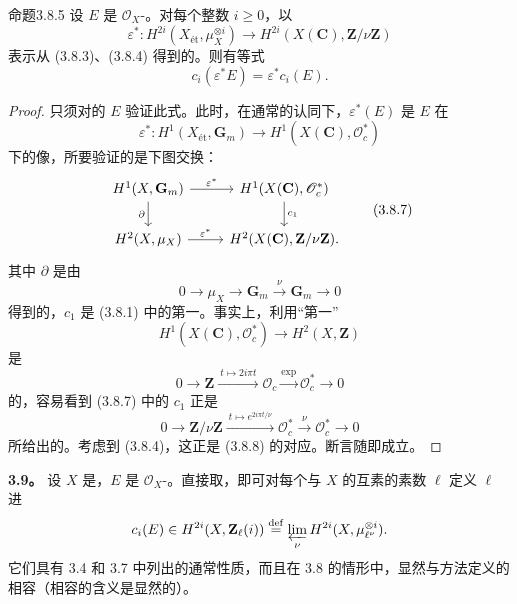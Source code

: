 \begin{SGAresult}{命题}{3.8.5}
设 $E$ 是 $\mathscr O_X$-。对每个整数 $i\ge0$，以
\[
 \varepsilon^*:H^{2i}(X_{\text{ét}},\mu_X^{\otimes i})
 \longrightarrow H^{2i}(X(\mathbf C),\mathbf Z/\nu\mathbf Z)
\]
表示从 (3.8.3)、(3.8.4) 得到的。则有等式
\[
 c_i(\varepsilon^*E)=\varepsilon^*c_i(E).
\]
\end{SGAresult}
\begin{proof}
只须对的 $E$ 验证此式。此时，在通常的认同下，$\varepsilon^*(E)$ 是 $E$ 在
\[
 \varepsilon^*:H^1(X_{\text{ét}},\mathbf G_m)\longrightarrow H^1(X(\mathbf C),\mathscr O_c^*)\tag{3.8.6}
\]
下的像，所要验证的是下图交换：
\[
\begin{tikzcd}
 H^1(X,\mathbf G_m) \arrow[r,"\varepsilon^*"] \arrow[d,"\partial"'] & H^1(X(\mathbf C),\mathscr O_c^*) \arrow[d,"c_1"]\\
 H^2(X,\mu_X) \arrow[r,"\varepsilon^*"] & H^2(X(\mathbf C),\mathbf Z/\nu\mathbf Z).
\end{tikzcd}\tag{3.8.7}
\]
其中 $\partial$ 是由
\[
 0\longrightarrow\mu_X\longrightarrow\mathbf G_m\xrightarrow{\nu}\mathbf G_m\longrightarrow0\tag{3.8.8}
\]
得到的，$c_1$ 是 (3.8.1) 中的第一。事实上，利用“第一”
\[
 H^1(X(\mathbf C),\mathscr O_c^*)\longrightarrow H^2(X,\mathbf Z)
\]
是
\[
 0\longrightarrow\mathbf Z\xrightarrow{\ t\mapsto2i\pi t\ }\mathscr O_c
 \xrightarrow{\exp}\mathscr O_c^*\longrightarrow0
\]
的，容易看到 (3.8.7) 中的 $c_1$ 正是
\[
 0\longrightarrow\mathbf Z/\nu\mathbf Z
 \xrightarrow{\ t\mapsto e^{2i\pi t/\nu}\ }\mathscr O_c^*
 \xrightarrow{\nu}\mathscr O_c^*\longrightarrow0
\]
所给出的。考虑到 (3.8.4)，这正是 (3.8.8) 的对应。断言随即成立。
\end{proof}

\textbf{3.9。} 设 $X$ 是，$E$ 是 $\mathscr O_X$-。直接取，即可对每个与 $X$ 的互素的素数 $\ell$ 定义 $\ell$ 进
\[
 c_i(E)\in H^{2i}(X,\mathbf Z_\ell(i))
 \overset{\mathrm{def}}=\varprojlim_\nu H^{2i}(X,\mu_{\ell^\nu}^{\otimes i}).
\]
它们具有 3.4 和 3.7 中列出的通常性质，而且在 3.8 的情形中，显然与方法定义的相容（相容的含义是显然的）。

